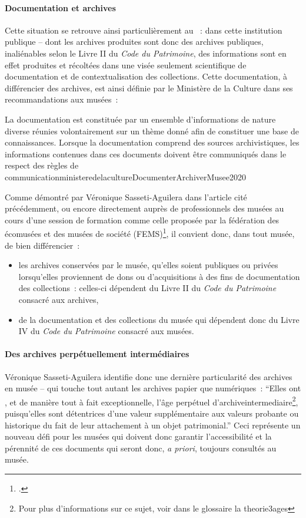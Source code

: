 \paragraph*{Documentation et archives}
Cette situation se retrouve ainsi particulièrement au \mae~: dans cette institution publique -- dont les archives produites sont donc des archives publiques, inaliénables selon le Livre II du \textit{Code du Patrimoine}, des informations sont en effet produites et récoltées dans une visée seulement scientifique de documentation et de contextualisation des collections. Cette documentation, à différencier des archives, est ainsi définie par le Ministère de la Culture dans ses recommandations aux musées~: 
\begin{myquote}
	{La documentation est constituée par un ensemble d'informations de nature diverse réunies volontairement sur un thème donné afin de constituer une base de connaissances. Lorsque la documentation comprend des sources archivistiques, les informations contenues dans ces documents doivent être communiqués dans le respect des règles de communication}{ministeredelacultureDocumenterArchiverMusee2020}
\end{myquote}

Comme démontré par Véronique Sasseti-Aguilera dans l'article cité précédemment, ou encore directement auprès de professionnels des musées au cours d'une session de formation comme celle proposée par la fédération des écomusées et des musées de société (FEMS)\footcite{federationdesecomuseesetmuseesdesocietefemsArchivesMusees2025}, il convient donc, dans tout musée, de bien différencier~:
\begin{itemize}
	\item les archives conservées par le musée, qu'elles soient publiques ou privées lorsqu'elles proviennent de dons ou d'acquisitions à des fins de documentation des collections~: celles-ci dépendent du Livre II du \textit{Code du Patrimoine} consacré aux archives, 
	\item de la documentation et des collections du musée qui dépendent donc du Livre IV du \textit{Code du Patrimoine} consacré aux musées.
\end{itemize}

\paragraph*{Des archives perpétuellement intermédiaires}
Véronique Sasseti-Aguilera identifie donc une dernière particularité des archives en musée -- qui touche tout autant les archives papier que numériques~: \enquote{Elles ont \textelp{}, et de manière tout à fait exceptionnelle, l’âge perpétuel d’\gls{archiveintermediaire}\footnote{Pour plus d'informations sur ce sujet, voir dans le glossaire la \gls{theorie3ages}}, puisqu’elles sont détentrices d’une valeur supplémentaire aux valeurs probante ou historique du fait de leur attachement à un objet patrimonial.} Ceci représente un nouveau défi pour les musées qui doivent donc garantir l'accessibilité et la pérennité de ces documents qui seront donc, \textit{a priori}, toujours consultés au musée.

